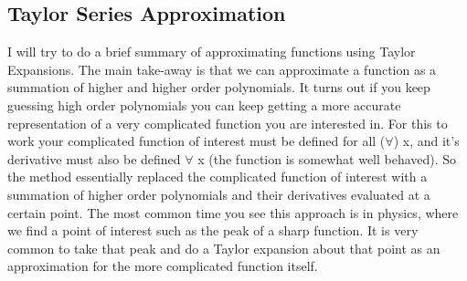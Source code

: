 \documentclass{article}
\begin{document}
\subsection*{Taylor Series Approximation}
I will try to do a brief summary of approximating functions using Taylor Expansions. 
The main take-away is that we can approximate a function as a summation of higher and higher order polynomials. 
It turns out if you keep guessing high order polynomials you can keep getting a more accurate representation of a very complicated function you are interested in.
For this to work your complicated function of interest must be defined for all ($\forall$) x, and it's derivative must also be defined $\forall$ x (the function is somewhat well behaved).
So the method essentially replaced the complicated function of interest with a summation of higher order polynomials and their derivatives evaluated at a certain point.
The most common time you see this approach is in physics, where we find a point of interest such as the peak of a sharp function.
It is very common to take that peak and do a Taylor expansion about that point as an approximation for the more complicated function itself. 
\end{document}
